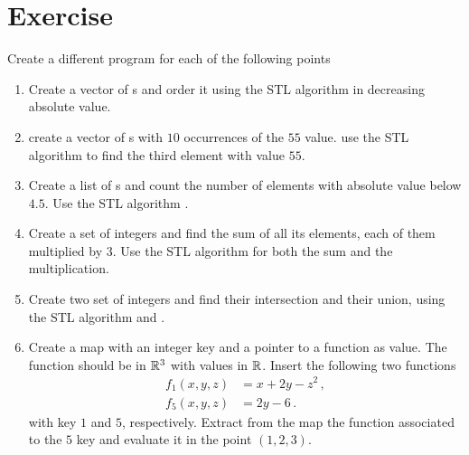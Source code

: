 \section*{Exercise}
Create a different program for each of the following points
\begin{enumerate}
    \item Create a vector of s and order it using the STL algorithm
     in decreasing absolute value.
    \item create a vector of s with $10$ occurrences of the $55$ value.
    use the STL algorithm  to find the third element with value $55$.
    \item Create a list of s and count the number of elements with
    absolute value below $4.5$. Use the STL algorithm .
    \item Create a set of integers and find the sum of all its elements, each
    of them multiplied by $3$. Use the STL algorithm  for both
    the sum and the multiplication.
    \item Create two set of integers and find their intersection and their
    union, using the STL algorithm  and .

    \item Create a map with an integer key and a pointer to a function as
    value. The function should be in $\mathbb{R}^3$ with values in $\mathbb{R}$. Insert the
    following two functions
    \begin{align*}
        f_1(x,y,z) &= x+2y-z^2\,,\\
        f_5(x,y,z) &= 2y-6\,.
    \end{align*}
    with key $1$ and $5$, respectively.
    Extract from the map the function associated to the $5$ key and evaluate it
    in the point $(1,2,3)$.
\end{enumerate}
